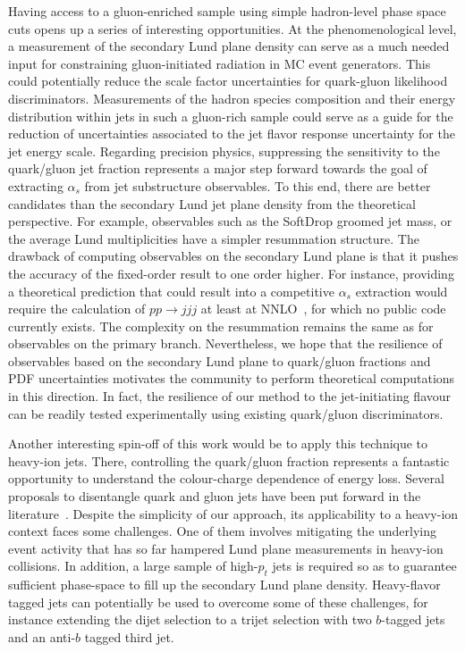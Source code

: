 \documentclass[a4paper,11pt]{article}
\begin{document}
Having access to a gluon-enriched sample using simple hadron-level phase space cuts opens up a series of interesting opportunities. At the phenomenological level, a measurement of the secondary Lund plane density can serve as a much needed input for constraining gluon-initiated radiation in MC event generators. This could potentially reduce the scale factor uncertainties for quark-gluon likelihood discriminators. Measurements of the hadron species composition and their energy distribution within jets in such a gluon-rich sample could serve as a guide for the reduction of uncertainties associated to the jet flavor response uncertainty for the jet energy scale. Regarding precision physics, suppressing the sensitivity to the quark/gluon jet fraction represents a major step forward towards the goal of extracting $\alpha_s$ from jet substructure observables. To this end, there are better candidates than the secondary Lund jet plane density from the theoretical perspective. For example, observables such as the SoftDrop groomed jet mass, or the average Lund multiplicities have a simpler resummation structure. The drawback of computing observables on the secondary Lund plane is that it pushes the accuracy of the fixed-order result to one order higher. For instance, providing a theoretical prediction that could result into a competitive $\alpha_s$ extraction would require the calculation of $pp\to jjj$ at least at NNLO~\cite{Czakon:2021mjy,ATLAS:2024png}, for which no public code currently exists. The complexity on the resummation remains the same as for observables on the primary branch. Nevertheless, we hope that the resilience of observables based on the secondary Lund plane to quark/gluon fractions and PDF uncertainties motivates the community to perform theoretical computations in this direction. In fact, the resilience of our method to the jet-initiating flavour can be readily tested experimentally using existing quark/gluon discriminators.

Another interesting spin-off of this work would be to apply this technique to heavy-ion jets. There, controlling the quark/gluon fraction represents a fantastic opportunity to understand the colour-charge dependence of energy loss. Several proposals to disentangle quark and gluon jets have been put forward in the literature~\cite{Chien:2018dfn,Li:2019dre,Brewer:2020och,Brewer:2021hmh,Ying:2022jvy,CMS:2020plq,Zhang:2023oid}. Despite the simplicity of our approach, its applicability to a heavy-ion context faces some challenges. One of them involves mitigating the underlying event activity that has so far hampered Lund plane measurements in heavy-ion collisions. In addition, a large sample of high-$p_t$ jets is required so as to guarantee sufficient phase-space to fill up the secondary Lund plane density. Heavy-flavor tagged jets can potentially be used to overcome some of these challenges, for instance extending the dijet selection to a trijet selection with two $b$-tagged jets and an anti-$b$ tagged third jet.
\end{document}
